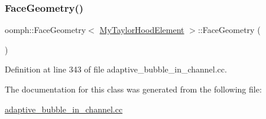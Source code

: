 \subsubsection{\texorpdfstring{Face\+Geometry()}{FaceGeometry()}}
{\footnotesize\ttfamily oomph\+::\+Face\+Geometry$<$ \hyperlink{classoomph_1_1MyTaylorHoodElement}{My\+Taylor\+Hood\+Element} $>$\+::Face\+Geometry (\begin{DoxyParamCaption}{ }\end{DoxyParamCaption})\hspace{0.3cm}{\ttfamily [inline]}}



Definition at line 343 of file adaptive\+\_\+bubble\+\_\+in\+\_\+channel.\+cc.



The documentation for this class was generated from the following file\+:\begin{DoxyCompactItemize}
\item 
\hyperlink{adaptive__bubble__in__channel_8cc}{adaptive\+\_\+bubble\+\_\+in\+\_\+channel.\+cc}\end{DoxyCompactItemize}
